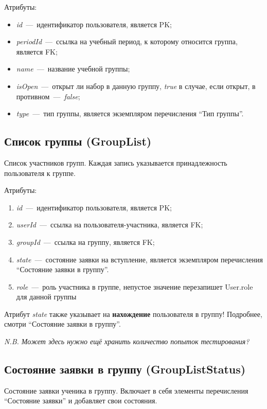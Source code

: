 \documentclass[14pt]{article}
\begin{document}
Атрибуты:
\begin{itemize}
	\item \emph{id}~---~идентификатор пользователя, является PK;
	\item \emph{periodId}~---~ссылка на учебный период, к которому относится группа, является FK;
	\item \emph{name}~---~название учебной группы;
	\item \emph{isOpen}~---~открыт ли набор в данную группу, \emph{true} в случае, если открыт, в противном~---~\emph{false};
	\item \emph{type}~---~тип группы, является экземпляром перечисления ``Тип группы''.
\end{itemize}

\subsection{Список группы (GroupList)}

Список участников групп. Каждая запись указывается принадлежность пользователя к группе. 

Атрибуты:
\begin{enumerate}
	\item \emph{id}~---~идентификатор пользователя, является PK; 
	\item \emph{userId}~---~ссылка на пользователя-участника, является FK;
	\item \emph{groupId}~---~ссылка на группу, является FK;
	\item \emph{state}~---~состояние заявки на вступление, является экземпляром перечисления ``Состояние заявки в группу''.
    \item \emph{role}~---~роль участника в группе, непустое значение перезапишет User.role для данной группы
\end{enumerate}

Атрибут \emph{state} также указывает на \textbf{нахождение} пользователя в группу! Подробнее, смотри  ``Состояние заявки в группу''.

\textit{N.B. Может здесь нужно ещё хранить количество попыток тестирования?}

\subsection{Состояние заявки в группу (GroupListStatus)}

Состояние заявки ученика в группу. Включает в себя элементы перечисления ``Состояние заявки'' и добавляет свои состояния.
\end{document}
